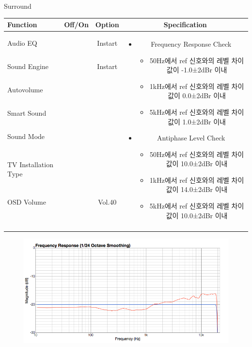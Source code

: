 \begin{frame}[t]{Surround}
\begin{tiny}
\begin{tabular}{@{}lccc@{}}
\toprule
Function & Off/On & Option & Specification \\
\midrule
Audio EQ & \color{black}{Off} & Instart &
\multirow{10}{60mm}{
\begin{itemize}\vspace{-3mm}
\item Frequency Response Check
	\begin{itemize}
		\item 50Hz에서 ref 신호와의 레벨 차이값이 -1.0±2dBr 이내
		\item 1kHz에서 ref 신호와의 레벨 차이값이 0.0±2dBr 이내
		\item 5kHz에서 ref 신호와의 레벨 차이값이 1.0±2dBr 이내	
	\end{itemize}
\item Antiphase Level Check
	\begin{itemize}
		\item 50Hz에서 ref 신호와의 레벨 차이값이 10.0±2dBr 이내
		\item 1kHz에서 ref 신호와의 레벨 차이값이 14.0±2dBr 이내
		\item 5kHz에서 ref 신호와의 레벨 차이값이 10.0±2dBr 이내
	\end{itemize}
\end{itemize}
} \\
Sound Engine & \color{blue}{On} & Instart & \\
Autovolume & \color{black}{Off} & & \\
Smart Sound & \color{black}{Off} & & \\
Sound Mode & \color{blue}{On} & \color{blue}{Surround} & \\
TV Installation Type & \color{blue}{On} & \color{black}{Standtype1} & \\
OSD Volume & \color{blue}{On} & Vol.40 & \\
& & & \\
& & & \\
& & & \\
& & & \\
\midrule
\end{tabular}
\end{tiny}

\begin{figure}[b]
\includegraphics[height=0.4\textwidth]{figures/surround.png}
\end{figure}

\end{frame}

